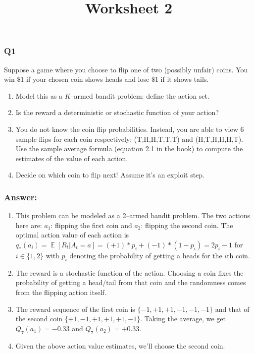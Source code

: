 \documentclass[a4paper, 10pt]{article}
\author{}
\date{}
\title{Worksheet 2 \vspace{-0.5cm}}
\DeclareMathOperator{\E}{\mathbb{E}}
\begin{document}
\maketitle
\vspace{-2cm}

\subsubsection*{Q1}
Suppose a game where you choose to flip one of two (possibly unfair) coins. You win $\$1$ if your chosen coin shows heads and lose $\$1$ if it shows tails.
\begin{enumerate}
\item Model this as a $K$--armed bandit problem: define the action set.%
\item Is the reward a deterministic or stochastic function of your action? %
\item You do not know the coin flip probabilities. Instead, you are able to view 6 sample flips for each coin respectively: (T,H,H,T,T,T) and (H,T,H,H,H,T). Use the sample average formula (equation 2.1 in the book) to compute the estimates of the value of each action. %
\item Decide on which coin to flip next! Assume it's an exploit step. %
\end{enumerate}

\subsubsection*{Answer:}
\begin{enumerate}
\item This problem can be modeled as a 2--armed bandit problem. The two actions here are: $a_1$: flipping the first coin and $a_2$: flipping the second coin. The optimal action value of each action is $q_*(a_i) = \E[R_t | A_t=a] = (+1) * p_i + (-1) * (1-p_i) = 2 p_i -1$ for $i \in \{1, 2\}$ with $p_i$ denoting the probability of getting a heads for the $i$th coin.
\item The reward is a stochastic function of the action. Choosing a coin fixes the probability of getting a head/tail from that coin and the randomness comes from the flipping action itself.
\item The reward sequence of the first coin is $\{-1, +1, +1, -1, -1, -1\}$ and that of the second coin $\{+1, -1, +1, +1, +1, -1\}$. Taking the average, we get $Q_7(a_1) = -0.33$ and $Q_7(a_2) = +0.33$.
\item Given the above action value estimates, we'll choose the second coin.
\end{enumerate}
\end{document}
